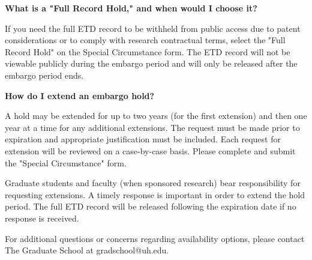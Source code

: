 \bigskip

\noindent\textbf{What is a "Full Record Hold," and when would I choose it?}

\noindent If you need the full ETD record to be withheld from public access due to patent considerations or to comply with research contractual terms, select the "Full Record Hold" on the Special Circumstance form. The ETD record will not be viewable publicly during the embargo period and will only be released after the embargo period ends.

\bigskip

\noindent\textbf{How do I extend an embargo hold?}

\noindent A hold may be extended for up to two years (for the first extension) and then one year at a time for any additional extensions. The request must be made prior to expiration and appropriate justification must be included. Each request for extension will be reviewed on a case-by-case basis. Please complete and submit the "Special Circumstance" form.

\bigskip

\noindent Graduate students and faculty (when sponsored research) bear responsibility for requesting extensions. A timely response is important in order to extend the hold period. The full ETD record will be released following the expiration date if no response is received.

\bigskip

\noindent For additional questions or concerns regarding availability options, please contact The Graduate School at gradschool@uh.edu.


